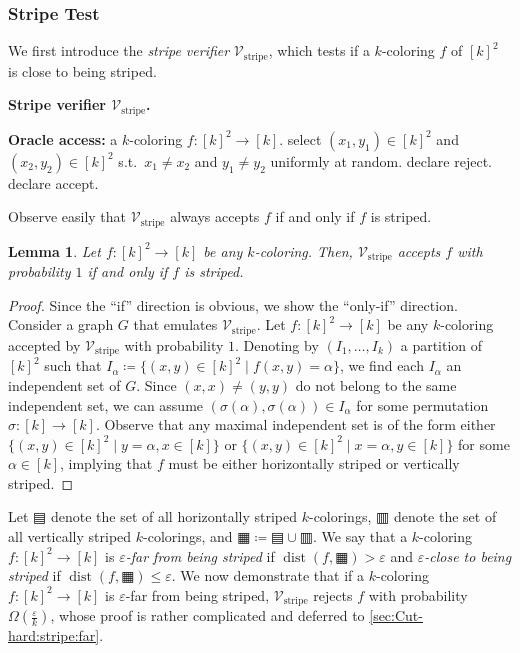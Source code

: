 \documentclass[11pt,fleqn]{article}
\renewcommand{\leq}{\leqslant}
\renewcommand{\epsilon}{\varepsilon}
\newcommand{\defeq}{\coloneq}
\DeclareMathOperator{\rHam}{\mathrm{dist}}
\newcommand{\V}{\calV}
\newcommand{\Accept}{\textsf{accept}\xspace}
\newcommand{\Reject}{\textsf{reject}\xspace}
\newcommand{\f}{f}
\newcommand{\hor}{\squarehfill}
\newcommand{\ver}{\squarevfill}
\newcommand{\str}{\squarehvfill}
\newcommand{\Vstripe}{\V_\mathrm{stripe}}
\newcommand{\calV}{\mathcal{V}}
\newtheorem{lemma}[theorem]{Lemma}
\theoremstyle{definition}
\numberwithin{equation}{section}
\begin{document}
\subsubsection{Stripe Test}
\label{sec:Cut-hard:tests:stripe}


We first introduce the \emph{stripe verifier} $\Vstripe$,
which tests if a $k$-coloring $\f$ of $[k]^2$ is close to being striped.


\begin{itembox}[l]{\textbf{Stripe verifier $\Vstripe$.}}
\begin{algorithmic}[1]
    \item[\textbf{Oracle access:}]
        a $k$-coloring $\f \colon [k]^2 \to [k]$.
    \State select $(x_1,y_1) \in [k]^2$ and $(x_2,y_2) \in [k]^2$
        s.t.~$x_1 \neq x_2$ and $y_1 \neq y_2$ uniformly at random.
    \If{$\f(x_1,y_1) = \f(x_2,y_2)$}
        \State declare \Reject.
    \Else
        \State declare \Accept.
    \EndIf
\end{algorithmic}
\end{itembox}


Observe easily that $\Vstripe$ always accepts $f$ if and only if $f$ is striped.


\begin{lemma}
\label{lem:Cut-hard:stripe:striped}
    Let  $\f \colon [k]^2 \to [k]$ be any $k$-coloring.
    Then, $\Vstripe$ accepts $\f$ with probability $1$
    if and only if $\f$ is striped.
\end{lemma}
\begin{proof} Since the ``if'' direction is obvious, we show the ``only-if'' direction.
Consider a graph $G$ that emulates $\Vstripe$.
Let $\f \colon [k]^2 \to [k]$ be any $k$-coloring
accepted by $\Vstripe$ with probability $1$.
Denoting by $(I_1, \ldots, I_k)$ a partition of $[k]^2$ such that
$I_\alpha \defeq \{(x,y) \in [k]^2 \mid \f(x,y) = \alpha\}$,
we find each $I_\alpha$ an independent set of $G$.
Since $(x,x) \neq (y,y)$ do not belong to the same independent set,
we can assume $(\sigma(\alpha),\sigma(\alpha)) \in I_\alpha$ for some permutation $\sigma \colon [k] \to [k]$.
Observe that any maximal independent set is of the form either
$\{ (x,y) \in [k]^2 \mid y = \alpha, x \in [k] \}$ or 
$\{ (x,y) \in [k]^2 \mid x = \alpha, y \in [k] \}$
for some $\alpha \in [k]$,
implying that $\f$ must be either horizontally striped or vertically striped.
\end{proof}


Let $\hor$ denote the set of all horizontally striped $k$-colorings,
$\ver$ denote the set of all vertically striped $k$-colorings, and
$\str \defeq \hor \cup \ver$.
We say that a $k$-coloring $\f \colon [k]^2 \to [k]$ is
\emph{$\epsilon$-far from being striped} if $\rHam(\f, \str) > \epsilon$ and
\emph{$\epsilon$-close to being striped} if $\rHam(\f, \str) \leq \epsilon$.
We now demonstrate that if a $k$-coloring $\f \colon [k]^2 \to [k]$ is $\epsilon$-far from being striped,
$\Vstripe$ rejects $\f$ with probability $\Omega\left(\frac{\epsilon}{k}\right)$,
whose proof is rather complicated and deferred to \cref{sec:Cut-hard:stripe:far}.
\end{document}
